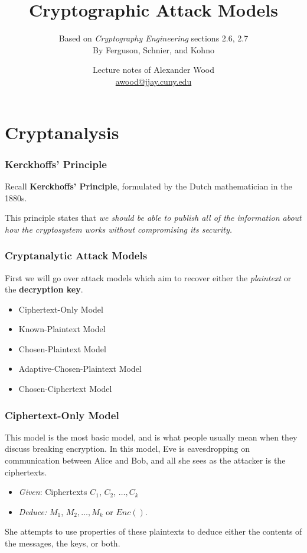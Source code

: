 \documentclass{beamer}
\title[OOP]{Cryptographic Attack Models}
\subtitle{Based on \emph{Cryptography Engineering} sections 2.6, 2.7 \\ By Ferguson, Schnier, and Kohno}
\author
{Lecture notes of Alexander Wood \\ \scriptsize \href{mailto:awood@jjay.cuny.edu}{awood@jjay.cuny.edu}}
\institute[JJay]{John Jay College of Criminal Justice}
\date{}
\newcommand{\<}{\langle}
\renewcommand{\>}{\rangle}
\begin{document}

\begin{frame}
  \titlepage
\end{frame}


\section{Cryptanalysis}



\begin{frame}
\frametitle{Kerckhoffs' Principle}

Recall \textbf{Kerckhoffs' Principle}, formulated by the Dutch mathematician in the 1880s. \newline

This principle states that \emph{we should be able to publish all of the information about how the cryptosystem works without compromising its security.}
\end{frame}

\begin{frame}
\frametitle{Cryptanalytic Attack Models}

First we will go over attack models which aim to recover either the \emph{plaintext} or the \textbf{decryption key}.

\begin{itemize}
\item Ciphertext-Only Model
\item Known-Plaintext Model
\item Chosen-Plaintext Model
\item Adaptive-Chosen-Plaintext Model
\item Chosen-Ciphertext Model
\end{itemize}
\end{frame}


\begin{frame}
\frametitle{Ciphertext-Only Model}

This model is the most basic model, and is what people usually mean when they discuss breaking encryption. In this model, Eve is eavesdropping on communication between Alice and Bob, and all she sees as the attacker is the ciphertexts.

\begin{itemize}
\item \emph{Given}: Ciphertexts $C_1$, $C_2$, $\dots, C_k$
\item \emph{Deduce:} $M_1$, $M_2, \dots, M_k$ or $Enc()$.
\end{itemize}

She attempts to use properties of these plaintexts to deduce either the contents of the messages, the keys, or both. 
\end{frame}
\end{document}
